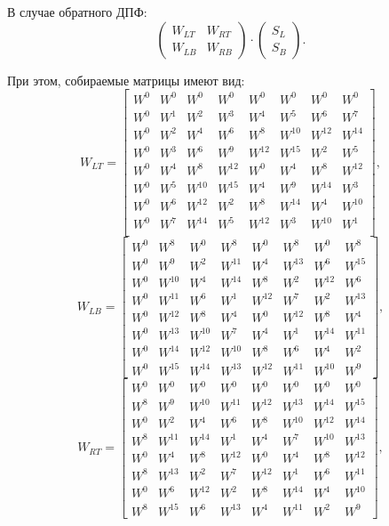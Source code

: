 В случае обратного ДПФ:
$$
\begin{pmatrix}
W_{LT} & W_{RT} \\
W_{LB} & W_{RB}
\end{pmatrix}
\cdot
\begin{pmatrix}
S_L \\
S_B
\end{pmatrix}.
$$

При этом, собираемые матрицы имеют вид:
$$
W_{LT} =
\begin{bmatrix}
W^0 &   W^0  &   W^0  &   W^0  &   W^0  &   W^0  &   W^0  &   W^0  \\
W^0 &   W^1  &   W^2  &   W^3  &   W^4  &   W^5  &   W^6  &   W^7  \\
W^0 &   W^2  &   W^4  &   W^6  &   W^8  & W^{10} & W^{12} & W^{14} \\
W^0 &   W^3  &   W^6  &   W^9  & W^{12} & W^{15} &   W^2  &   W^5  \\
W^0 &   W^4  &   W^8  & W^{12} &   W^0  &   W^4  &   W^8  & W^{12} \\
W^0 &   W^5  & W^{10} & W^{15} &   W^4  &   W^9  & W^{14} &   W^3  \\
W^0 &   W^6  & W^{12} &   W^2  &   W^8  & W^{14} &   W^4  & W^{10} \\
W^0 &   W^7  & W^{14} &   W^5  & W^{12} &   W^3  & W^{10} &   W^1  \\
\end{bmatrix},
$$
$$
W_{LB} =
\begin{bmatrix}
W^0 &   W^8  &   W^0  &   W^8  &   W^0  &   W^8  &   W^0  &   W^8  \\
W^0 &   W^9  &   W^2  & W^{11} &   W^4  & W^{13} &   W^6  & W^{15} \\
W^0 & W^{10} &   W^4  & W^{14} &   W^8  &   W^2  & W^{12} &   W^6  \\
W^0 & W^{11} &   W^6  &   W^1  & W^{12} &   W^7  &   W^2  & W^{13} \\
W^0 & W^{12} &   W^8  &   W^4  &   W^0  & W^{12} &   W^8  &   W^4  \\
W^0 & W^{13} & W^{10} &   W^7  &   W^4  &   W^1  & W^{14} & W^{11} \\
W^0 & W^{14} & W^{12} & W^{10} &   W^8  &   W^6  &   W^4  &   W^2  \\
W^0 & W^{15} & W^{14} & W^{13} & W^{12} & W^{11} & W^{10} &   W^9
\end{bmatrix},
$$
$$
W_{RT} =
\begin{bmatrix}
W^0 &   W^0  &   W^0  &   W^0  &   W^0  &   W^0  &   W^0  &   W^0  \\
W^8 &   W^9  & W^{10} & W^{11} & W^{12} & W^{13} & W^{14} & W^{15} \\
W^0 &   W^2  &   W^4  &   W^6  &   W^8  & W^{10} & W^{12} & W^{14} \\
W^8 & W^{11} & W^{14} &   W^1  &   W^4  &   W^7  & W^{10} & W^{13} \\
W^0 &   W^4  &   W^8  & W^{12} &   W^0  &   W^4  &   W^8  & W^{12} \\
W^8 & W^{13} &   W^2  &   W^7  & W^{12} &   W^1  &   W^6  & W^{11} \\
W^0 &   W^6  & W^{12} &   W^2  &   W^8  & W^{14} &   W^4  & W^{10} \\
W^8 & W^{15} &   W^6  & W^{13} &   W^4  & W^{11} &   W^2  &   W^9
\end{bmatrix},
$$
